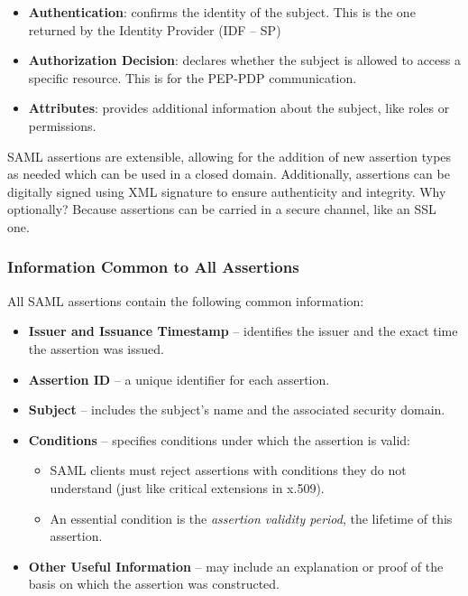 \begin{itemize}
    \item \textbf{Authentication}: confirms the identity of the
      subject. This is the one returned by the Identity Provider (IDF
      – SP)
    \item \textbf{Authorization Decision}: declares whether the
      subject is allowed to access a specific resource. This is for
      the PEP-PDP communication.
    \item \textbf{Attributes}: provides additional information about
      the subject, like roles or permissions.
\end{itemize}

SAML assertions are extensible, allowing for the addition of new
assertion types as needed which can be used in a closed domain.
Additionally, assertions can be digitally signed using XML signature
to ensure authenticity and integrity. Why optionally? Because
assertions can be carried in a secure channel, like an SSL one.

\subsubsection{Information Common to All Assertions}

All SAML assertions contain the following common information:

\begin{itemize}
    \item \textbf{Issuer and Issuance Timestamp} – identifies the
      issuer and the exact time the assertion was issued.
    \item \textbf{Assertion ID} – a unique identifier for each
      assertion.
    \item \textbf{Subject} – includes the subject's name and the
      associated security domain.
    \item \textbf{Conditions} – specifies conditions under which the
      assertion is valid:
    \begin{itemize}
        \item SAML clients must reject assertions with conditions they
          do not understand (just like critical extensions in x.509).
        \item An essential condition is the \textit{assertion validity
          period}, the lifetime of this assertion.
    \end{itemize}
    \item \textbf{Other Useful Information} – may include an
      explanation or proof of the basis on which the assertion was
      constructed.
\end{itemize}


